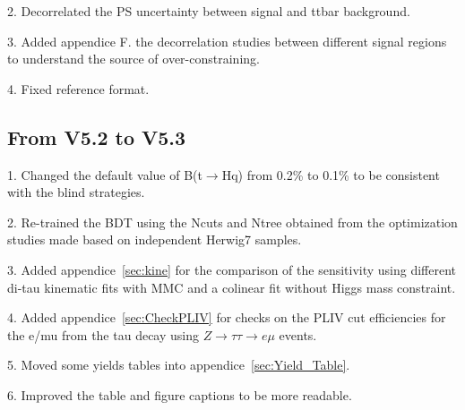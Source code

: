 2. Decorrelated the PS uncertainty between signal and ttbar background.

3. Added appendice F. the decorrelation studies between different signal regions to understand the source of over-constraining.

4. Fixed reference format.

\subsection{From V5.2 to V5.3}

1. Changed the default value of B(t$\rightarrow$Hq) from 0.2\% to 0.1\% to be consistent with the blind strategies.

2. Re-trained the BDT using the Ncuts and Ntree obtained from the optimization studies made based on independent Herwig7 samples.

3. Added appendice~\ref{sec:kine} for the comparison of the sensitivity using different di-tau kinematic fits with MMC and a colinear fit without Higgs mass constraint.

4. Added appendice~\ref{sec:CheckPLIV} for checks on the PLIV cut efficiencies for the e/mu from the tau decay using $Z\rightarrow\tau\tau\rightarrow e\mu$ events.

5. Moved some yields tables into appendice~\ref{sec:Yield_Table}.

6. Improved the table and figure captions to be more readable. 

